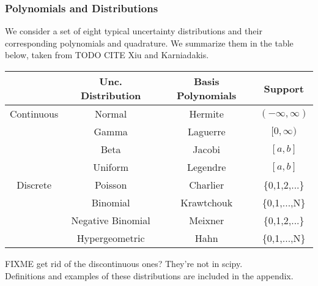 \subsubsection{Polynomials and Distributions}
We consider a set of eight typical uncertainty distributions and their corresponding polynomials and quadrature.  We summarize them in the table below, taken from TODO CITE Xiu and Karniadakis.  
\begin{center}
\begin{tabular}{c|c|c|c}
 & Unc. Distribution & Basis Polynomials & Support \\ \hline\hline
Continuous & Normal & Hermite & $(-\infty,\infty)$ \\
 & Gamma & Laguerre & $[0,\infty)$ \\
 & Beta & Jacobi & $[a,b]$ \\
 & Uniform & Legendre & $[a,b]$ \\ \hline
Discrete & Poisson & Charlier & \{0,1,2,...\}\\
 & Binomial & Krawtchouk & \{0,1,...,N\}\\
 & Negative Binomial & Meixner & \{0,1,2,...\}\\
 & Hypergeometric & Hahn & \{0,1,...,N\}
\end{tabular}
\end{center}
FIXME get rid of the discontinuous ones?  They're not in scipy.\\
Definitions and examples of these distributions are included in the appendix.

